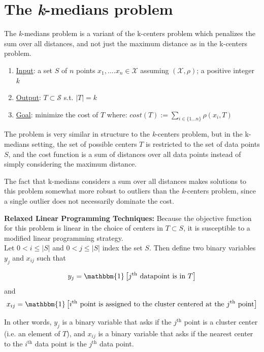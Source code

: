 \section{The \emph{k}-medians problem}
The \emph{k}-medians problem is a variant of the k-centers problem 
which penalizes the sum over all distances, and not just the maximum distance
as in the k-centers problem.

\begin{enumerate}
\item \underline{Input}: a set $S$ of $n$ points $x_1,....x_n \in 
\mathcal{X}$ assuming $(\mathcal{X},\rho)$; a positive integer $k$
\item \underline{Output}: $T \subset \mathcal{S}$ s.t. $|T| = k$
\item \underline{Goal}: minimize the cost of $T$ where: $ cost(T)
:= \sum_{i \in \{1...n\}} \rho(x_i,T) $
\end{enumerate}

The problem is very similar in structure to the \emph{k}-centers problem,
but in the k-medians setting, the set of possible centers $T$ is restricted to the set of data points $S$,
and the cost function is a sum of distances over all data points instead of simply considering the maximum distance. 

\begin{remark}
The fact that k-medians considers a sum over all distances makes solutions to
this problem somewhat more robust to outliers than the \emph{k}-centers problem,
since a single outlier does not necessarily dominate the cost.
\end{remark}

\noindent\textbf{Relaxed Linear Programming Techniques:} Because the objective function for this problem is linear in the choice of
centers in $T\subset S$, it is susceptible to a modified linear programming strategy.\\

Let $0< i\leq |S|$ and $0 < j\leq |S|$ index the set $S$. Then define two
binary variables $y_j$ and $x_{ij}$ such that

$$y_j = \mathbbm{1}\left[j^\text{th}\text{ datapoint is in } T\right]$$
and
$$x_{ij} = \mathbbm{1}\left[i^\text{th} \text{ point is assigned to the cluster centered at the }j^\text{th} \text{ point}\right]$$

In other words, $y_j$ is a binary variable that asks if the 
$j^\text{th}$ point is a cluster center (i.e. an element of $T$), 
and $x_{ij}$ is a binary variable that asks if the nearest center to
the $i^\text{th}$ data point is the $j^\text{th}$ data point.

